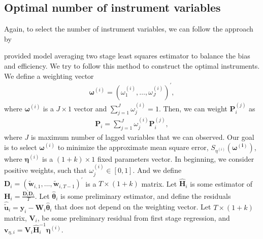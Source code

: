 \documentclass[12pt,a4paper,hyperref]{article}
\begin{document}
\subsection{Optimal number of instrument variables}
Again, to select the number of instrument variables, we can follow the approach by \citet{Kuersteiner:2010} 


\citet{Kuersteiner:2010} provided model averaging two stage least squares estimator to balance the bias and efficiency. We try to follow this method to construct the optimal instruments. We define a weighting vector
\begin{align}
\boldsymbol{\omega}^{(i)}=\left(\omega^{(i)}_{1}, \ldots,\omega^{(i)}_{J}  \right)^{'},
\end{align}
where $\boldsymbol{\omega}^{(i)}$ is a $J \times 1$ vector and $\sum^{J}_{j=1} \omega^{(i)}_{j}=1.$
Then, we can weight $\boldsymbol{P}^{(j)}_{i}$ as
\begin{align}
\boldsymbol{P}_{i}= \sum^{J}_{j=1} \omega^{(i)}_{j} \boldsymbol{P}^{(j)}_{i},
\end{align}
where $J$ is maximum number of lagged variables that we can observed.
Our goal is to select $\boldsymbol{\omega}^{(i)}$ to minimize the approximate mean square error, $S_{\eta^{(i)}}\left(\boldsymbol{\omega^{(i)}} \right)$, where $\boldsymbol{\eta}^{(i)}$ is a $(1+k) \times 1$ fixed parameters vector.
 In beginning, we consider positive weights, such that $\omega^{(i)}_{j} \in [0,1].$ And we define $\boldsymbol{D}_{i}=\left( \tilde{\boldsymbol{w}}_{i,1},\ldots,  \tilde{\boldsymbol{w}}_{i,T-1} \right)^{'}$ is a $T \times (1+k)$ matrix. Let $\hat{\boldsymbol{H}}_{i}$ is some estimator of $\boldsymbol{H}_{i}=\frac{\boldsymbol{D}^{'}_{i}\boldsymbol{D}_{i}}{T}$. Let $\hat{\boldsymbol{\theta}}_{i}$ is some preliminary estimator, and define the residuals $\hat{\tilde{\boldsymbol{u}}}_{i}=\boldsymbol{y}_{i}-\boldsymbol{W}_{i}\hat{\boldsymbol{\theta}}_{i}$ that does not depend on the weighting vector.  Let $T \times (1+k)$ matrix, $\boldsymbol{V}_{i}$, be some preliminary residual from first stage regression, and $\boldsymbol{v}_{\eta, i}=\boldsymbol{V}_{i} \hat{\boldsymbol{H}}_{i}^{-1}\boldsymbol{\eta}^{(i)}$.
\end{document}
